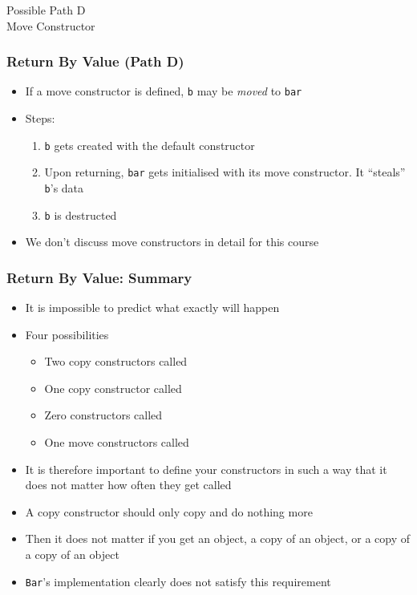 \begin{frame}
  \begin{center} \Huge
    Possible Path D \\[4mm]
    Move Constructor
  \end{center}
\end{frame}

\begin{frame}
  \frametitle{Return By Value (Path D)}
  \begin{itemize}
    \item If a move constructor is defined, {\tt b}
          may be \emph{moved} to {\tt bar}
    \item Steps:
          \begin{enumerate}
            \item {\tt b} gets created with the default constructor
            \item Upon returning, {\tt bar} gets initialised with its move constructor.
                  It ``steals'' {\tt b}'s data
            \item {\tt b} is destructed
          \end{enumerate}
    \item We don't discuss move constructors in detail for this course
  \end{itemize}
\end{frame}

\begin{frame}
  \frametitle{Return By Value: Summary}
  \begin{itemize}
    \item It is impossible to predict what exactly will happen
    \item Four possibilities
          \begin{itemize}
            \item Two copy constructors called
            \item One copy constructor called
            \item Zero constructors called
            \item One move constructors called
          \end{itemize}
    \item It is therefore important to define your constructors in such a way
          that it does not matter how often they get called
    \item A copy constructor should only copy and do nothing more
    \item Then it does not matter if you get an object, a copy of an object, or a copy of a copy of an object
    \item {\tt Bar}'s implementation clearly does not satisfy this requirement
  \end{itemize}
\end{frame}

